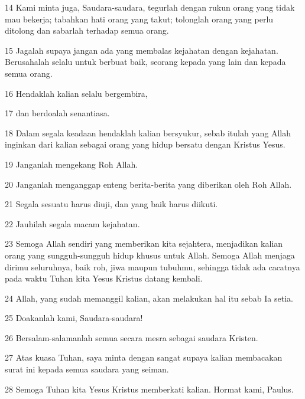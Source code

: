 \par 14 Kami minta juga, Saudara-saudara, tegurlah dengan rukun orang yang tidak mau bekerja; tabahkan hati orang yang takut; tolonglah orang yang perlu ditolong dan sabarlah terhadap semua orang.
\par 15 Jagalah supaya jangan ada yang membalas kejahatan dengan kejahatan. Berusahalah selalu untuk berbuat baik, seorang kepada yang lain dan kepada semua orang.
\par 16 Hendaklah kalian selalu bergembira,
\par 17 dan berdoalah senantiasa.
\par 18 Dalam segala keadaan hendaklah kalian bersyukur, sebab itulah yang Allah inginkan dari kalian sebagai orang yang hidup bersatu dengan Kristus Yesus.
\par 19 Janganlah mengekang Roh Allah.
\par 20 Janganlah menganggap enteng berita-berita yang diberikan oleh Roh Allah.
\par 21 Segala sesuatu harus diuji, dan yang baik harus diikuti.
\par 22 Jauhilah segala macam kejahatan.
\par 23 Semoga Allah sendiri yang memberikan kita sejahtera, menjadikan kalian orang yang sungguh-sungguh hidup khusus untuk Allah. Semoga Allah menjaga dirimu seluruhnya, baik roh, jiwa maupun tubuhmu, sehingga tidak ada cacatnya pada waktu Tuhan kita Yesus Kristus datang kembali.
\par 24 Allah, yang sudah memanggil kalian, akan melakukan hal itu sebab Ia setia.
\par 25 Doakanlah kami, Saudara-saudara!
\par 26 Bersalam-salamanlah semua secara mesra sebagai saudara Kristen.
\par 27 Atas kuasa Tuhan, saya minta dengan sangat supaya kalian membacakan surat ini kepada semua saudara yang seiman.
\par 28 Semoga Tuhan kita Yesus Kristus memberkati kalian. Hormat kami, Paulus.


